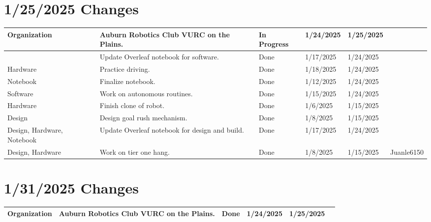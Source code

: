 \section{1/25/2025 Changes}
\begin{center}
\begin{longtable}{| p{40pt} | p{150pt} | p{35pt} | p{33pt} | p{33pt} | p{40pt} |}
\hline \rowcolor{LightGoldenrod1}
Organization & Auburn Robotics Club VURC on the Plains. & In Progress & 1/24/2025 & 1/25/2025 & \\
\hline \rowcolor{DarkSeaGreen1}
& Update Overleaf notebook for software. & Done & 1/17/2025 & 1/24/2025 & \\
\hline \rowcolor{DarkSeaGreen1}
Hardware & Practice driving. & Done & 1/18/2025 & 1/24/2025 & \\
\hline \rowcolor{DarkSeaGreen1}
Notebook & Finalize notebook. & Done & 1/12/2025 & 1/24/2025 & \\
\hline \rowcolor{DarkSeaGreen1}
Software & Work on autonomous routines. & Done & 1/15/2025 & 1/24/2025 & \\
\hline \rowcolor{DarkSeaGreen1}
Hardware & Finish clone of robot. & Done & 1/6/2025 & 1/15/2025 & \\
\hline \rowcolor{DarkSeaGreen1}
Design & Design goal rush mechanism. & Done & 1/8/2025 & 1/15/2025 & \\
\hline \rowcolor{DarkSeaGreen1}
Design, Hardware, Notebook & Update Overleaf notebook for design and build. & Done & 1/17/2025 & 1/24/2025 & \\
\hline \rowcolor{DarkSeaGreen1}
Design, Hardware & Work on tier one hang. & Done & 1/8/2025 & 1/15/2025 & Juanle6150 \\
\hline
\end{longtable}
\end{center}


\section{1/31/2025 Changes}
\begin{center}
\begin{longtable}{| p{40pt} | p{150pt} | p{35pt} | p{33pt} | p{33pt} | p{40pt} |}
\hline \rowcolor{DarkSeaGreen1}
Organization & Auburn Robotics Club VURC on the Plains. & Done & 1/24/2025 & 1/25/2025 & \\
\hline
\end{longtable}
\end{center}


